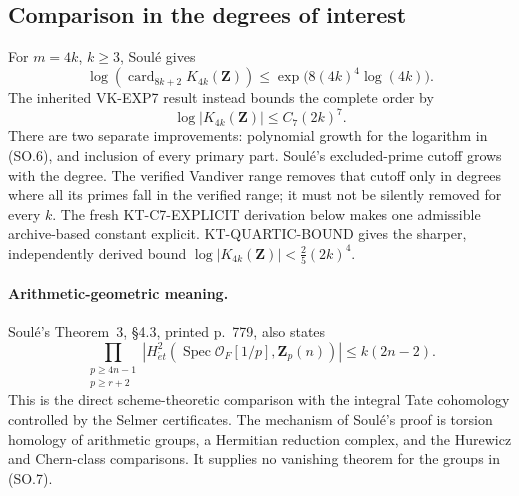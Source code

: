 \subsection{Comparison in the degrees of interest}

For $m=4k$, $k\geq3$, Soul\'e gives
\[
 \log\left(
   \operatorname{card}_{8k+2} K_{4k}(\mathbf Z)
 \right)
 \leq \exp\!\bigl(8(4k)^4\log(4k)\bigr).
 \tag{SO.5}
\]
The inherited VK-EXP7 result instead bounds the complete order
by
\[
       \log|K_{4k}(\mathbf Z)|\leq C_7(2k)^7.
 \tag{SO.6}
\]
There are two separate improvements: polynomial growth for
the logarithm in (SO.6), and inclusion of every primary part.
Soul\'e's excluded-prime cutoff grows with the degree.
The verified Vandiver range removes that cutoff only in
degrees where all its primes fall in the verified range;
it must not be silently removed for every $k$.
The fresh KT-C7-EXPLICIT derivation below makes one admissible
archive-based constant explicit. KT-QUARTIC-BOUND gives the
sharper, independently derived bound
$\log|K_{4k}(\mathbf Z)|<\frac25(2k)^4$.

\paragraph{Arithmetic-geometric meaning.}
Soul\'e's Theorem~3, \S4.3, printed p.~779, also states
\[
 \prod_{\substack{p\geq4n-1\\p\geq r+2}}
 \left|H^2_{\acute et}(\operatorname{Spec}\mathcal O_F[1/p],
                                      \mathbf Z_p(n))\right|
 \leq k(2n-2).
 \tag{SO.7}
\]
This is the direct scheme-theoretic comparison with the
integral Tate cohomology controlled by the Selmer certificates.
The mechanism of Soul\'e's proof is torsion homology of
arithmetic groups, a Hermitian reduction complex, and the
Hurewicz and Chern-class comparisons. It supplies no
vanishing theorem for the groups in (SO.7).
